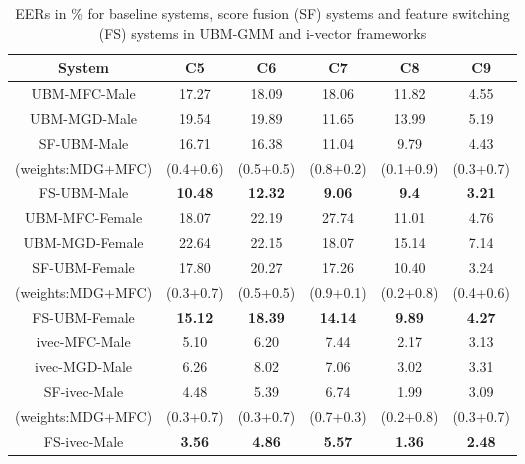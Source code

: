 \documentclass{article}
\begin{document}
\begin{table}[t]
	\centering
	\caption{EERs in \% for baseline systems, score fusion (SF) systems and feature switching (FS) systems in UBM-GMM and i-vector frameworks}
	\begin{tabular}{|c|c|c|c|c|c|} \hline
 {\bf System} & {\bf C5 } &  {\bf C6} & {\bf C7} & {\bf C8}  & {\bf C9  }\\ \hline \hline

UBM-MFC-Male & 17.27 & 18.09 & 18.06 & 11.82 & 4.55 \\ \hline

UBM-MGD-Male & 19.54 & 19.89 & 11.65 & 13.99 & 5.19 \\ \hline

SF-UBM-Male & 16.71 & 16.38 & 11.04 & 9.79 & 4.43 \\ 
(weights:MDG+MFC) & (0.4+0.6) & (0.5+0.5) & (0.8+0.2) & (0.1+0.9) & (0.3+0.7) \\ \hline

{FS-UBM-Male} & {\bf 10.48} & {\bf 12.32} & {\bf 9.06} & {\bf 9.4} & {\bf 3.21} \\  \hline

{UBM-MFC-Female} & 18.07 & 22.19 & 27.74 & 11.01 & 4.76 \\ \hline

{UBM-MGD-Female} & 22.64 & 22.15 & 18.07 & 15.14 & 7.14 \\ \hline

SF-UBM-Female & 17.80 & 20.27 & 17.26 & 10.40 & 3.24 \\ 
(weights:MDG+MFC) & (0.3+0.7) & (0.5+0.5) & (0.9+0.1) & (0.2+0.8) & (0.4+0.6) \\ \hline

{FS-UBM-Female} & {\bf 15.12 } & {\bf 18.39} & {\bf 14.14} & {\bf 9.89} & {\bf 4.27} \\ \hline

{ivec-MFC-Male} & 5.10 & 6.20 & 7.44 & 2.17 & 3.13 \\ \hline

{ivec-MGD-Male} &  6.26 & 8.02 & 7.06 & 3.02 & 3.31  \\ \hline

SF-ivec-Male & 4.48 & 5.39 & 6.74 & 1.99 & 3.09 \\ 
(weights:MDG+MFC) & (0.3+0.7) & (0.3+0.7) & (0.7+0.3) & (0.2+0.8) & (0.3+0.7) \\ \hline

{FS-ivec-Male} & {\bf 3.56} & {\bf 4.86} & {\bf 5.57} & {\bf 1.36} & {\bf 2.48} \\ \hline


\end{tabular}
\end{table}
\end{document}
